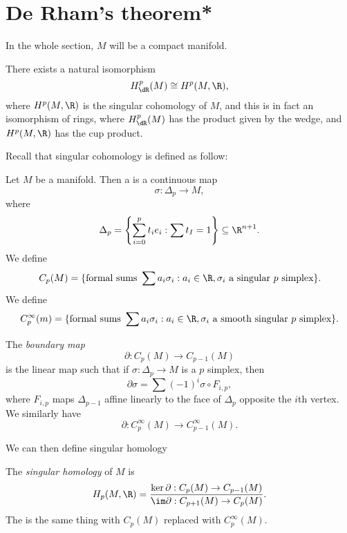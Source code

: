 \documentclass[a4paper]{article}
\begin{document}

\section{De Rham's theorem*}
In the whole section, $M$ will be a compact manifold.

\begin{thm}
  There exists a natural isomorphism
  \[
    H^p_{\dR}(M) \cong H^p(M, \R),
  \]
  where $H^p(M, \R)$ is the singular cohomology of $M$, and this is in fact an isomorphism of rings, where $H^p_{\dR}(M)$ has the product given by the wedge, and $H^p(M, \R)$ has the cup product.
\end{thm}

Recall that singular cohomology is defined as follow:
\begin{defi}
  Let $M$ be a manifold. Then a  is a continuous map
  \[
    \sigma: \Delta_p \to M,
  \]
  where
  \[
    \Delta_p = \left\{\sum_{i = 0}^p t_i e_i: \sum t_I = 1\right\} \subseteq \R^{n + 1}.
  \]
  We define
  \[
    C_p(M) = \{\text{formal sums }\sum a_i \sigma_i: a_i \in \R, \sigma_i\text{ a singular $p$ simplex}\}.
  \]
  We define
  \[
    C_p^\infty(m) = \{\text{formal sums }\sum a_i \sigma_i: a_i \in \R, \sigma_i\text{ a smooth singular $p$ simplex}\}.
  \]
\end{defi}

\begin{defi}
  The \emph{boundary map}
  \[
    \partial: C_p(M) \to C_{p - 1}(M)
  \]
  is the linear map such that if $\sigma: \Delta_p \to M$ is a $p$ simplex, then
  \[
    \partial \sigma = \sum (-1)^i \sigma \circ F_{i, p},
  \]
  where $F_{i, p}$ maps $\Delta_{p - 1}$ affine linearly to the face of $\Delta_p$ opposite the $i$th vertex. We similarly have
  \[
    \partial: C_p^\infty(M) \to C_{p - 1}^\infty(M).
  \]
\end{defi}

We can then define singular homology
\begin{defi}
  The \emph{singular homology} of $M$ is
  \[
    H_p(M, \R) = \frac{\ker \partial: C_p(M) \to C_{p - 1}(M)}{\im \partial: C_{p + 1}(M) \to C_p(M)}.
  \]
  The  is the same thing with $C_p(M)$ replaced with $C_p^\infty(M)$.
\end{defi}
\end{document}
